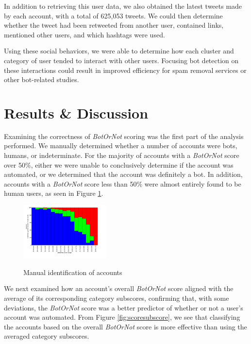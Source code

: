 \documentclass{sig-alternate-05-2015}
\begin{document}
In addition to retrieving this user data, we also obtained the latest tweets made by each account, with a total of 625,053 tweets. We could then determine whether the tweet had been retweeted from another user, contained links, mentioned other users, and which hashtags were used.

Using these social behaviors, we were able to determine how each cluster and category of user tended to interact with other users. Focusing bot detection on these interactions could result in improved efficiency for spam removal services or other bot-related studies.

\section{Results \& Discussion}

Examining the correctness of \emph{BotOrNot} scoring was the first part of the analysis performed. We manually determined whether a number of accounts were bots, humans, or indeterminate. For the majority of accounts with a \emph{BotOrNot} score over 50\%, either we were unable to conclusively determine if the account was automated, or we determined that the account was definitely a bot. In addition, accounts with a \emph{BotOrNot} score less than 50\% were almost entirely found to be human users, as seen in Figure \ref{fig:scorescat}.

\begin{figure}[h!]
	\caption{Manual identification of accounts}
	\centering
		\includegraphics[width=0.4\textwidth]{imgs/scoreperc}
	\label{fig:scorescat}
	
\end{figure}

We next examined how an account's overall \emph{BotOrNot} score aligned with the average of its corresponding category subscores, confirming that, with some deviations, the \emph{BotOrNot} score was a better predictor of whether or not a user's account was automated. From Figure \ref{fig:scoresubscore}, we see that classifying the accounts based on the overall \emph{BotOrNot} score is more effective than using the averaged category subscores.
\end{document}
